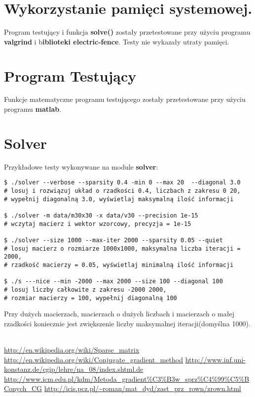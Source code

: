 \documentclass[bibtotocnumbered, headsepline,normalheadings,12pt,polish]{scrreprt}
\begin{document}
\section{Wykorzystanie pamięci systemowej.}
Program testujący i funkcja \textbf{solve()} zostały przetestowane przy użyciu programu \textbf{valgrind} i b\textbf{iblioteki electric-fence}. Testy nie wykazały utraty pamięci.
\section{Program Testujący}
Funkcje matematyczne programu testującego zostały przetestowane przy użyciu programu \textbf{matlab}.
\section{Solver}
Przykładowe testy wykonywane na module \textbf{solver}: \\
\small
\begin{verbatim}
$ ./solver --verbose --sparsity 0.4 -min 0 --max 20  --diagonal 3.0
# losuj i rozwiązuj układ o rzadkości 0.4, liczbach z zakresu 0 20,
# wypełnij diagonalną 3.0, wyświetlaj maksymalną ilość informacji

$ ./solver -m data/m30x30 -x data/v30 --precision 1e-15
# wczytaj macierz i wektor wzorcowy, precyzja = 1e-15

$ ./solver --size 1000 --max-iter 2000 --sparsity 0.05 --quiet
# losuj macierz o rozmiarze 1000x1000, maksymalna liczba iteracji = 2000,
# rzadkość macierzy = 0.05, wyświetlaj minimalną ilość informacji

$ ./s ---nice --min -2000 --max 2000 --size 100 --diagonal 100
# losuj liczby całkowite z zakresu -2000 2000,
# rozmiar macierzy = 100, wypełnij diagonalną 100
\end{verbatim}
\normalsize
Przy dużych macierzach, macierzach o dużych liczbach i macierzach o małej rzadkości koniecznie jest zwiększenie liczby maksymalnej iteracji(domyślna 1000).


\begin{thebibliography}
\\

 \url{http://en.wikipedia.org/wiki/Sparse_matrix}
 \url{http://en.wikipedia.org/wiki/Conjugate_gradient_method}
 \url{http://www.inf.uni-konstanz.de/cgip/lehre/na_08/index.shtml.de}
 \url{http://www.icm.edu.pl/kdm/Metoda_gradient%C3%B3w_sprz%C4%99%C5%BConych_CG}
 \url{http://icis.pcz.pl/~roman/mat_dyd/zast_prz_rown/zrown.html}
\end{thebibliography}
\end{document}
